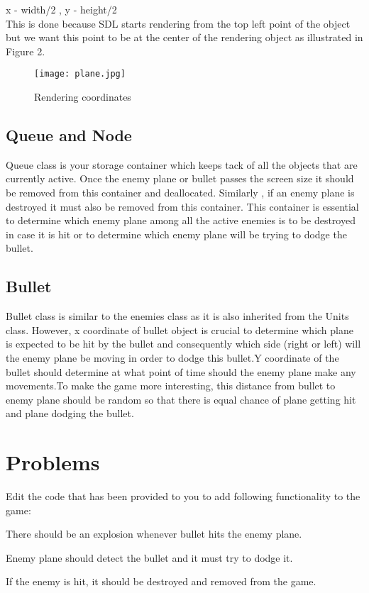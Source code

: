 \documentclass[11pt,fleqn]{book} %
\begin{document}
x - width/2 , y - height/2\\
\hfill \break
This is done because SDL starts rendering from the top left point of the object but we want this point to be at the center of the rendering object as illustrated in Figure 2.

\begin{figure}[h]
  \centering\texttt{[image: plane.jpg]}
  \caption{Rendering coordinates}
\end{figure}

\subsection{Queue and Node}
Queue class is your storage container which keeps tack of all the objects that are currently active. Once the enemy plane or bullet passes the screen size it should be removed from this container and deallocated. Similarly , if an enemy plane is destroyed it must also be removed from this container. This container is essential to determine which enemy plane among all the active enemies is to be destroyed in case it is hit or to determine which enemy plane will be trying to dodge the bullet. 

\subsection{Bullet}
Bullet class is similar to the enemies class as it is also inherited from the Units class. However, x coordinate of bullet object is crucial to determine which plane is expected to be hit by the bullet and consequently which side (right or left) will the enemy plane be moving in order to dodge this bullet.Y coordinate of the bullet should determine at what point of time should the enemy plane make any movements.To make the game more interesting, this distance from bullet to enemy plane should be random so that there is equal chance of plane getting hit and plane dodging the bullet.

\section{Problems}
Edit the code that has been provided to you to add following functionality to the game:\\
\begin{problem} There should be an explosion whenever bullet hits the enemy plane.\\
\end{problem}
\begin{problem} Enemy plane should detect the bullet and it must try to dodge it.\\
\end{problem}
\begin{problem} If the enemy is hit, it should be destroyed and removed from the game.
\end{problem}
\end{document}

